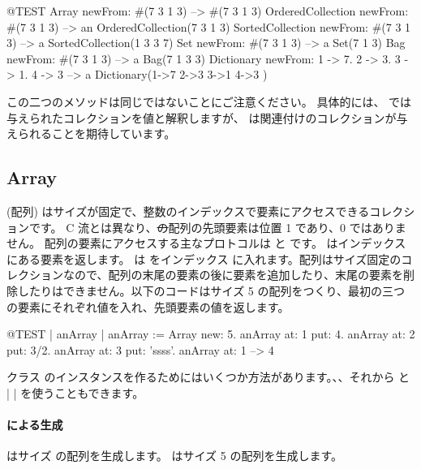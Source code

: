 \documentclass[a4paper,10pt,twoside]{book}
\begin{document}
\begin{code}{@TEST}
Array newFrom: #(7 3 1 3)                                          --> #(7 3 1 3)
OrderedCollection newFrom: #(7 3 1 3)                     --> an OrderedCollection(7 3 1 3)
SortedCollection newFrom: #(7 3 1 3)                       --> a SortedCollection(1 3 3 7)
Set newFrom: #(7 3 1 3)                                            --> a Set(7 1 3)
Bag newFrom: #(7 3 1 3)                                           --> a Bag(7 1 3 3)
Dictionary newFrom: {1 -> 7. 2 -> 3. 3 -> 1. 4 -> 3} --> a Dictionary(1->7 2->3 3->1 4->3 )
\end{code}
\noindent
この二つのメソッドは同じではないことにご注意ください。
具体的には、 では与えられたコレクションを値と解釈しますが、 は関連付けのコレクションが与えられることを期待しています。

\subsection{Array}
 (配列) はサイズが固定で、整数のインデックスで要素にアクセスできるコレクションです。
C 流とは異なり、\st の配列の先頭要素は位置 1 であり、0 ではありません。
配列の要素にアクセスする主なプロトコルは  と  です。 はインデックス  にある要素を返します。 は  をインデックス  に入れます。配列はサイズ固定のコレクションなので、配列の末尾の要素の後に要素を追加したり、末尾の要素を削除したりはできません。以下のコードはサイズ 5 の配列をつくり、最初の三つの要素にそれぞれ値を入れ、先頭要素の値を返します。

\begin{code}{@TEST | anArray | }
anArray := Array new: 5.
anArray at: 1 put: 4.
anArray at: 2 put: 3/2.
anArray at: 3 put: 'ssss'.
anArray at: 1 --> 4
\end{code}

クラス  のインスタンスを作るためにはいくつか方法があります。、、それから \ct{#( )} と \ct|{ }| を使うこともできます。

\paragraph{ による生成}  はサイズ  の配列を生成します。
 はサイズ 5 の配列を生成します。
\end{document}
